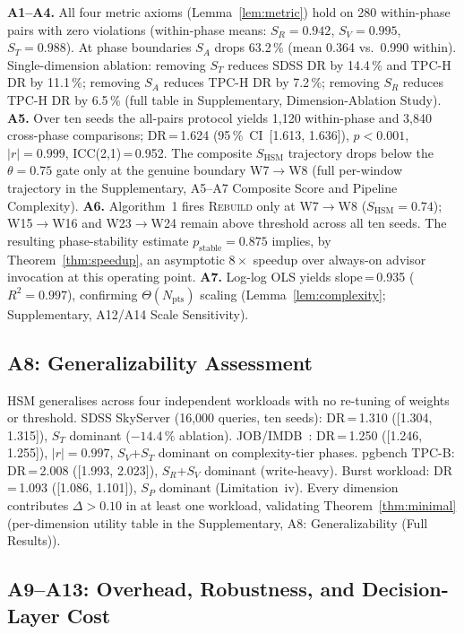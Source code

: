 \documentclass[10pt,journal,compsoc]{IEEEtran}
\newcommand{\SHSM}{S_{\mathrm{HSM}}}
\newcommand{\SR}{S_{R}}
\newcommand{\SV}{S_{V}}
\newcommand{\ST}{S_{T}}
\newcommand{\SA}{S_{A}}
\newcommand{\SPER}{S_{P}}
\newcommand{\Npts}{N_{\mathrm{pts}}}
\begin{document}
\textbf{A1--A4.} All four metric axioms (Lemma~\ref{lem:metric}) hold
on 280 within-phase pairs with zero violations
(within-phase means: $\SR\!=\!0.942$, $\SV\!=\!0.995$,
$\ST\!=\!0.988$). At phase boundaries $\SA$ drops 63.2\,\%
(mean 0.364 vs.\ 0.990 within). Single-dimension ablation: removing
$\ST$ reduces SDSS DR by 14.4\,\% and TPC-H DR by 11.1\,\%;
removing $\SA$ reduces TPC-H DR by 7.2\,\%; removing $\SR$ reduces
TPC-H DR by 6.5\,\% (full table in Supplementary,
Dimension-Ablation Study).
\textbf{A5.} Over ten seeds the all-pairs
protocol yields 1{,}120 within-phase and 3{,}840 cross-phase
comparisons; DR\,=\,1.624 (95\,\%~CI~[1.613, 1.636]),
$p\!<\!0.001$, $|r|\!=\!0.999$, ICC(2,1)\,=\,0.952. The composite
$\SHSM$ trajectory drops below the $\theta\!=\!0.75$ gate only at
the genuine boundary W7$\to$W8 (full per-window trajectory in the
Supplementary, A5--A7 Composite Score and Pipeline Complexity).
\textbf{A6.} Algorithm~1 fires \textsc{Rebuild} only at W7$\to$W8
($\SHSM\!=\!0.74$); W15$\to$W16 and W23$\to$W24 remain above
threshold across all ten seeds. The resulting phase-stability
estimate $p_{\mathrm{stable}}\!=\!0.875$ implies, by
Theorem~\ref{thm:speedup}, an asymptotic
$8\times$ speedup over always-on advisor invocation at this
operating point.
\textbf{A7.} Log-log OLS yields slope\,=\,0.935 ($R^2\!=\!0.997$),
confirming $\Theta(\Npts)$ scaling (Lemma~\ref{lem:complexity};
Supplementary, A12/A14 Scale Sensitivity).

\subsection{A8: Generalizability Assessment}

HSM generalises across four independent workloads with no re-tuning
of weights or threshold. SDSS SkyServer (16{,}000 queries, ten
seeds): DR\,=\,1.310 ([1.304, 1.315]), $\ST$
dominant ($-14.4\,\%$ ablation). JOB/IMDB~\cite{Leis2015JOB}:
DR\,=\,1.250 ([1.246, 1.255]), $|r|\!=\!0.997$,
$\SV$+$\ST$ dominant on complexity-tier phases. pgbench TPC-B:
DR\,=\,2.008 ([1.993, 2.023]), $\SR$+$\SV$
dominant (write-heavy). Burst workload:
DR\,=\,1.093 ([1.086, 1.101]), $\SPER$
dominant (Limitation~iv). Every dimension contributes
$\Delta\!>\!0.10$ in at least one workload, validating
Theorem~\ref{thm:minimal} (per-dimension utility table in the
Supplementary, A8: Generalizability (Full Results)).

\subsection{A9--A13: Overhead, Robustness, and Decision-Layer Cost}
\end{document}

